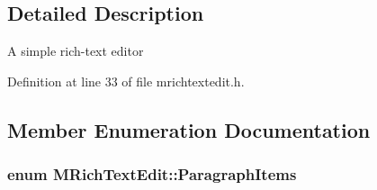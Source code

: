 \subsection{Detailed Description}
A simple rich-\/text editor 

Definition at line 33 of file mrichtextedit.\+h.



\subsection{Member Enumeration Documentation}
\hypertarget{class_m_rich_text_edit_adcd0ff6843f4184f25c01c6319015932}{}
\subsubsection[{Paragraph\+Items}]{\setlength{\rightskip}{0pt plus 5cm}enum {\bf M\+Rich\+Text\+Edit\+::\+Paragraph\+Items}\hspace{0.3cm}{\ttfamily [protected]}}\label{class_m_rich_text_edit_adcd0ff6843f4184f25c01c6319015932}
